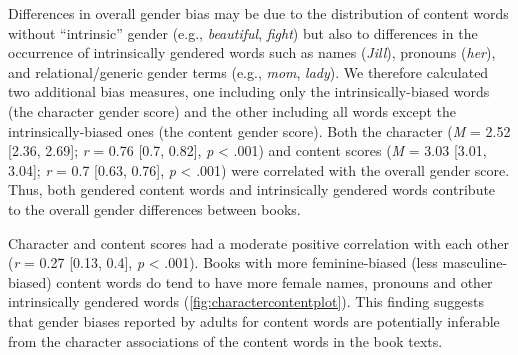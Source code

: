 \documentclass[
  english,
  ,man,floatsintext]{apa6}
\begin{document}
Differences in overall gender bias may be due to the distribution of content words without \enquote{intrinsic} gender (e.g., \emph{beautiful}, \emph{fight}) but also to differences in the occurrence of intrinsically gendered words such as names (\emph{Jill}), pronouns (\emph{her}), and relational/generic gender terms (e.g., \emph{mom}, \emph{lady}). We therefore calculated two additional bias measures, one including only the intrinsically-biased words (the character gender score) and the other including all words except the intrinsically-biased ones (the content gender score). Both the character (\emph{M} = 2.52 {[}2.36, 2.69{]}; \emph{r} = 0.76 {[}0.7, 0.82{]}, \emph{p} \textless{} .001) and content scores (\emph{M} = 3.03 {[}3.01, 3.04{]}; \emph{r} = 0.7 {[}0.63, 0.76{]}, \emph{p} \textless{} .001) were correlated with the overall gender score. Thus, both gendered content words and intrinsically gendered words contribute to the overall gender differences between books.

Character and content scores had a moderate positive correlation with each other (\emph{r} = 0.27 {[}0.13, 0.4{]}, \emph{p} \textless{} .001). Books with more feminine-biased (less masculine-biased) content words do tend to have more female names, pronouns and other intrinsically gendered words (\autoref{fig:charactercontentplot}). This finding suggests that gender biases reported by adults for content words are potentially inferable from the character associations of the content words in the book texts.
\end{document}

